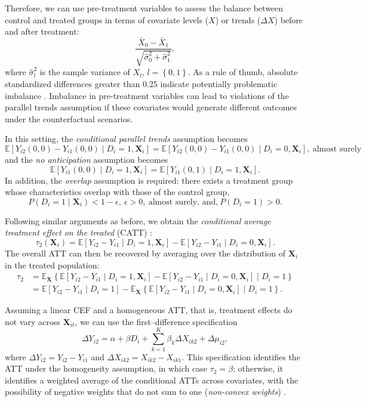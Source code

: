 Therefore, we can use pre-treatment variables to assess the balance between control and treated groups in terms of covariate levels ($X$) or trends ($\Delta X$) before and after treatment:
\[
\frac{\bar{X}_0-\bar{X}_1}{\sqrt{\hat{\sigma}_0^2+\hat{\sigma}_1^2}},
\] 
where $\hat{\sigma}_l^2$ is the sample variance of $X_l$, $l=\left\{0,1\right\}$. 
As a rule of thumb, absolute standardized differences greater than 0.25 indicate potentially problematic imbalance \cite{baker2025did_guide}. Imbalance in pre-treatment variables can lead to violations of the parallel trends assumption if these covariates would generate different outcomes under the counterfactual scenarios.

In this setting, the \textit{conditional parallel trends} assumption becomes
\begin{equation}
	\mathbb{E}[Y_{i2}(0,0) - Y_{i1}(0,0) \mid D_i = 1, \mathbf{X}_i] 
	= \mathbb{E}[Y_{i2}(0,0) - Y_{i1}(0,0) \mid D_i = 0, \mathbf{X}_i], \ \text{almost surely}
\end{equation}
and the \textit{no anticipation} assumption becomes
\begin{equation}
	\mathbb{E}[Y_{i1}(0,0) \mid D_i = 1, \mathbf{X}_i] 
	= \mathbb{E}[Y_{i1}(0,1) \mid D_i = 1, \mathbf{X}_i].
\end{equation} 
In addition, the \textit{overlap} assumption is required: there exists a treatment group whose characteristics overlap with those of the control group,
\[
P(D_i = 1 \mid \mathbf{X}_i) < 1 - \epsilon, \ \epsilon >0, \ \text{almost surely, and,} \ P(D_i=1)>0.
\]

Following similar arguments as before, we obtain the \textit{conditional average treatment effect on the treated} (CATT) \cite{baker2025did_guide}:
\[
\tau_2(\mathbf{X}_i)= \mathbb{E}[Y_{i2} - Y_{i1} \mid D_i = 1, \mathbf{X}_i] - \mathbb{E}[Y_{i2} - Y_{i1} \mid D_i = 0, \mathbf{X}_i].
\]
The overall ATT can then be recovered by averaging over the distribution of $\mathbf{X}_i$ in the treated population:
\begin{align*}
	\tau_2 & = \mathbb{E}_{\mathbf{X}}\left\{\mathbb{E}[Y_{i2} - Y_{i1} \mid D_i = 1, \mathbf{X}_i] - \mathbb{E}[Y_{i2} - Y_{i1} \mid D_i = 0, \mathbf{X}_i] \mid D_i = 1\right\}\\
	&=\mathbb{E}[Y_{i2} - Y_{i1} \mid D_i = 1]-\mathbb{E}_{\mathbf{X}}\left\{\mathbb{E}[Y_{i2} - Y_{i1} \mid D_i = 0, \mathbf{X}_i]\mid D_i=1\right\}.
\end{align*}

Assuming a linear CEF and a homogeneous ATT, that is, treatment effects do not vary across $\mathbf{X}_{it}$, we can use the first–difference specification
\[
\Delta Y_{i2} = \alpha + \beta D_i + \sum_{k=1}^K \beta_k \Delta X_{ik2} + \Delta\mu_{i2},
\]
where $\Delta Y_{i2} = Y_{i2} - Y_{i1}$ and $\Delta X_{ik2} = X_{ik2} - X_{ik1}$. This specification identifies the ATT under the homogeneity assumption, in which case $\tau_2 = \beta$; otherwise, it identifies a weighted average of the conditional ATTs across covariates, with the possibility of negative weights that do not sum to one (\textit{non-convex weights}) \cite{baker2025did_guide}.

